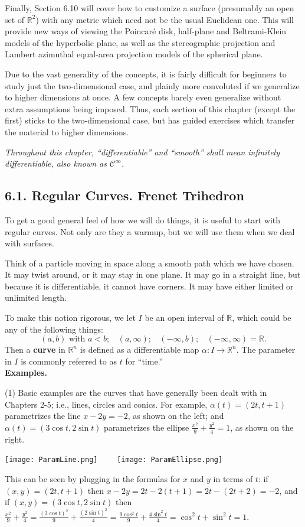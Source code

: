 \documentclass[leqno]{book}
\begin{document}
Finally, Section 6.10 will cover how to customize a surface (presumably an open set of $\mathbb R^2$) with any metric which need not be the usual Euclidean one.  This will provide new ways of viewing the Poincar\'e disk, half-plane and Beltrami-Klein models of the hyperbolic plane, as well as the stereographic projection and Lambert azimuthal equal-area projection models of the spherical plane.

Due to the vast generality of the concepts, it is fairly difficult for beginners to study just the two-dimensional case, and plainly more convoluted if we generalize to higher dimensions at once.  A few concepts barely even generalize without extra assumptions being imposed.  Thus, each section of this chapter (except the first) sticks to the two-dimensional case, but has guided exercises which transfer the material to higher dimensions.

\emph{Throughout this chapter, ``differentiable'' and ``smooth'' shall mean infinitely differentiable, also known as $\mathcal C^\infty$.}%

\subsection*{6.1. Regular Curves.  Frenet Trihedron}
To get a good general feel of how we will do things, it is useful to start with regular curves.  Not only are they a warmup, but we will use them when we deal with surfaces.

Think of a particle moving in space along a smooth path which we have chosen.  It may twist around, or it may stay in one plane.  It may go in a straight line, but because it is differentiable, it cannot have corners.  It may have either limited or unlimited length.

To make this notion rigorous, we let $I$ be an open interval of $\mathbb R$, which could be any of the following things:
$$(a,b)\text{ with }a<b;~~~~(a,\infty);~~~~(-\infty,b);~~~~(-\infty,\infty)=\mathbb R.$$
Then a \textbf{curve} in $\mathbb R^n$ is defined as a differentiable map $\alpha:I\to\mathbb R^n$.  The parameter in $I$ is commonly referred to as $t$ for ``time.''  \\

\noindent\textbf{Examples.}

(1) Basic examples are the curves that have generally been dealt with in Chapters 2-5; i.e., lines, circles and conics.  For example, $\alpha(t)=(2t,t+1)$ parametrizes the line $x-2y=-2$, as shown on the left; and $\alpha(t)=(3\cos t,2\sin t)$ parametrizes the ellipse $\frac{x^2}9+\frac{y^2}4=1$, as shown on the right.
\begin{center}
\texttt{[image: ParamLine.png]}~~~~
\texttt{[image: ParamEllipse.png]}
\end{center}
This can be seen by plugging in the formulas for $x$ and $y$ in terms of $t$: if $(x,y)=(2t,t+1)$ then $x-2y=2t-2(t+1)=2t-(2t+2)=-2$, and if $(x,y)=(3\cos t,2\sin t)$ then $\frac{x^2}9+\frac{y^2}4=\frac{(3\cos t)^2}9+\frac{(2\sin t)^2}4=\frac{9\cos^2t}9+\frac{4\sin^2t}4=\cos^2t+\sin^2t=1$.
\end{document}
